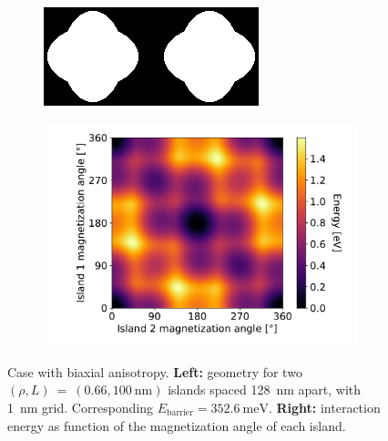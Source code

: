 \documentclass[11pt,a4paper,english]{article}
\begin{document}
\begin{figure}
    \centering
    \begin{subfigure}[c]{4cm} %
         \centering
         \includegraphics[width=\textwidth]{Figures/two_islands/Geometry/geom_r0.66_s100_d128_a0,0_cell1nm.png}
     \end{subfigure}
    \begin{subfigure}[c]{0.7\columnwidth}
         \centering
         \includegraphics[width=\textwidth]{Figures/two_islands/EnergyLandscape/Int_a0Pi,0Pi_d128_r0.66,0.66_cell1nm.pdf}
     \end{subfigure}
    \caption{Case with biaxial anisotropy. \textbf{Left:} geometry for two $(\rho, L)~=~(0.66, \SI{100}{\nano\metre})$ islands spaced \SI{128}{\nano\metre} apart, with \SI{1}{\nano\metre} grid. Corresponding $E_\mathrm{barrier}=\SI{352.6}{\milli\electronvolt}$. \textbf{Right:} interaction energy as function of the magnetization angle of each island.}
    \label{fig:two-islands_interaction_(r0.66_L100)_a0and0}
\end{figure}
\end{document}
